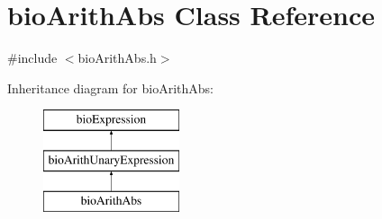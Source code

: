 \hypertarget{classbio_arith_abs}{}\section{bio\+Arith\+Abs Class Reference}
\label{classbio_arith_abs}


{\ttfamily \#include $<$bio\+Arith\+Abs.\+h$>$}

Inheritance diagram for bio\+Arith\+Abs\+:\begin{figure}[H]
\begin{center}
\leavevmode
\includegraphics[height=3.000000cm]{classbio_arith_abs}
\end{center}
\end{figure}
